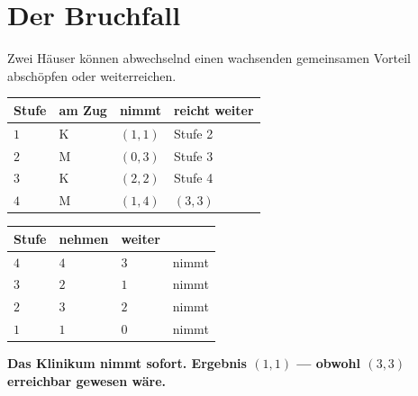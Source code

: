 \section{Der Bruchfall}

\begin{warnung}
Zwei Häuser können abwechselnd einen wachsenden gemeinsamen Vorteil abschöpfen oder weiterreichen.

\begin{center}
{\small
\renewcommand{\arraystretch}{1.5}
\begin{tabular}{@{}P{1.4cm}P{1.6cm}P{2.2cm}P{2.6cm}@{}}
\toprule
\textbf{Stufe} & \textbf{am Zug} & \textbf{nimmt} & \textbf{reicht weiter}\\
\midrule
$1$ & K & $(1,1)$ & Stufe 2\\
$2$ & M & $(0,3)$ & Stufe 3\\
$3$ & K & $(2,2)$ & Stufe 4\\
$4$ & M & $(1,4)$ & $(3,3)$\\
\bottomrule
\end{tabular}}
\end{center}

\begin{center}
{\small
\renewcommand{\arraystretch}{1.48}
\begin{tabular}{@{}P{1.4cm}P{2.4cm}P{2.4cm}P{1.6cm}@{}}
\toprule
\textbf{Stufe} & \textbf{nehmen} & \textbf{weiter} & \\
\midrule
$4$ & $4$ & $3$ & \textcolor{akzent}{nimmt}\\
$3$ & $2$ & $1$ & \textcolor{akzent}{nimmt}\\
$2$ & $3$ & $2$ & \textcolor{akzent}{nimmt}\\
$1$ & $1$ & $0$ & \textcolor{akzent}{nimmt}\\
\bottomrule
\end{tabular}}
\end{center}

\begin{center}
\begin{minipage}{0.9\textwidth}
\textbf{Das Klinikum nimmt sofort. Ergebnis $(1,1)$ --- obwohl $(3,3)$ erreichbar gewesen wäre.}
\end{minipage}
\end{center}

\begin{center}
\begin{minipage}{0.88\textwidth}
\end{minipage}
\end{center}


\end{warnung}
